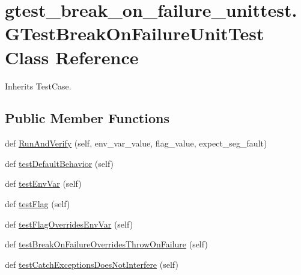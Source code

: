 \hypertarget{classgtest__break__on__failure__unittest_1_1GTestBreakOnFailureUnitTest}{}\section{gtest\+\_\+break\+\_\+on\+\_\+failure\+\_\+unittest.\+G\+Test\+Break\+On\+Failure\+Unit\+Test Class Reference}
\label{classgtest__break__on__failure__unittest_1_1GTestBreakOnFailureUnitTest}


Inherits Test\+Case.

\subsection*{Public Member Functions}
\begin{DoxyCompactItemize}
\item 
def \mbox{\hyperlink{classgtest__break__on__failure__unittest_1_1GTestBreakOnFailureUnitTest_a0a66475873f545d88655b8bb14368f2e}{Run\+And\+Verify}} (self, env\+\_\+var\+\_\+value, flag\+\_\+value, expect\+\_\+seg\+\_\+fault)
\item 
def \mbox{\hyperlink{classgtest__break__on__failure__unittest_1_1GTestBreakOnFailureUnitTest_a8c21b7ecccc27268cb6c3d30b933b812}{test\+Default\+Behavior}} (self)
\item 
def \mbox{\hyperlink{classgtest__break__on__failure__unittest_1_1GTestBreakOnFailureUnitTest_a2beae948940a4fd898c8183c3bb221da}{test\+Env\+Var}} (self)
\item 
def \mbox{\hyperlink{classgtest__break__on__failure__unittest_1_1GTestBreakOnFailureUnitTest_af6018e5253c1107c5afaba3e2cb573fe}{test\+Flag}} (self)
\item 
def \mbox{\hyperlink{classgtest__break__on__failure__unittest_1_1GTestBreakOnFailureUnitTest_a15836ddb27e51e9aaf2f8aad84f5cef7}{test\+Flag\+Overrides\+Env\+Var}} (self)
\item 
def \mbox{\hyperlink{classgtest__break__on__failure__unittest_1_1GTestBreakOnFailureUnitTest_a3c5855e045236a309a5bff73ee6b503e}{test\+Break\+On\+Failure\+Overrides\+Throw\+On\+Failure}} (self)
\item 
def \mbox{\hyperlink{classgtest__break__on__failure__unittest_1_1GTestBreakOnFailureUnitTest_a70cc7732ac68ffe587657a3a5309aa4a}{test\+Catch\+Exceptions\+Does\+Not\+Interfere}} (self)
\end{DoxyCompactItemize}


